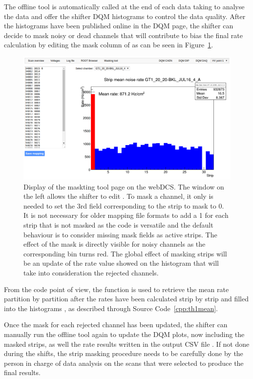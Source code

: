 	The offline tool is automatically called at the end of each data taking to analyse the data and offer the shifter DQM histograms to control the data quality. After the histograms have been published online in the DQM page, the shifter can decide to mask noisy or dead channels that will contribute to bias the final rate calculation by editing the mask column of  as can be seen in Figure~\ref{fig:maskingtool}.
	
	\begin{figure}[H]
		\centering
		\includegraphics[width = \linewidth]{fig/app2/MaskingTool.png}
		\caption{\label{fig:maskingtool} Display of the maskting tool page on the webDCS. The window on the left allows the shifter to edit . To mask a channel, it only is needed to set the 3rd field corresponding to the strip to mask to 0. It is not necessary for older mapping file formats to add a 1 for each strip that is not masked as the code is versatile and the default behaviour is to consider missing mask fields as active strips. The effect of the mask is directly visible for noisy channels as the corresponding bin turns red. The global effect of masking strips will be an update of the rate value showed on the histogram that will take into consideration the rejected channels.}
	\end{figure}
	
	From the code point of view, the function  is used to retrieve the mean rate partition by partition after the rates have been calculated strip by strip and filled into the histograms , as described through Source Code~\ref{cpp:th1mean}.
	
	Once the mask for each rejected channel has been updated, the shifter can manually run the offline tool again to update the DQM plots, now including the masked strips, as well the rate results written in the output CSV file . If not done during the shifts, the strip masking procedure needs to be carefully done by the person in charge of data analysis on the scans that were selected to produce the final results.\\
	
